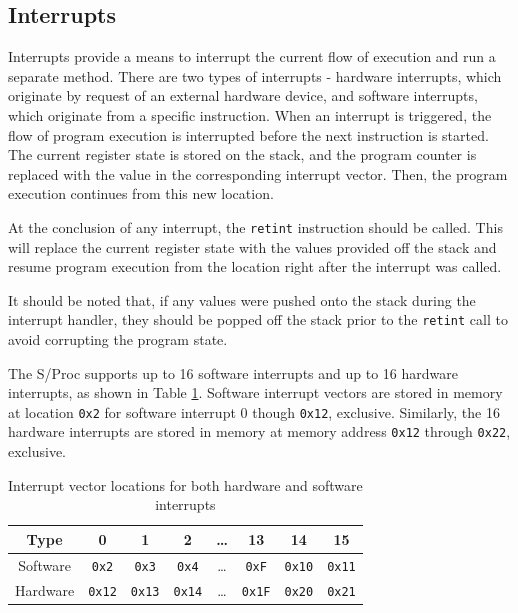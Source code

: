 \documentclass{article}
\begin{document}
\subsection{Interrupts}

Interrupts provide a means to interrupt the current flow of execution and run a separate method. There are two types of interrupts - hardware interrupts, which originate by request of an external hardware device, and software interrupts, which originate from a specific instruction. When an interrupt is triggered, the flow of program execution is interrupted before the next instruction is started. The current register state is stored on the stack, and the program counter is replaced with the value in the corresponding interrupt vector. Then, the program execution continues from this new location.

At the conclusion of any interrupt, the \texttt{retint} instruction should be called. This will replace the current register state with the values provided off the stack and resume program execution from the location right after the interrupt was called.

It should be noted that, if any values were pushed onto the stack during the interrupt handler, they should be popped off the stack prior to the \texttt{retint} call to avoid corrupting the program state.

The S/Proc supports up to 16 software interrupts and up to 16 hardware interrupts, as shown in Table \ref{table:interrupt-vector-locations}. Software interrupt vectors are stored in memory at location \texttt{0x2} for software interrupt 0 though \texttt{0x12}, exclusive. Similarly, the 16 hardware interrupts are stored in memory at memory address \texttt{0x12} through \texttt{0x22}, exclusive.

\begin{table}[h!]
	\centering
	\begin{tabular}{c|ccccccc}
		\hline
		Type & 0 & 1 & 2 & \dots & 13 & 14 & 15 \\
		\hline
		Software & \texttt{0x2} & \texttt{0x3} & \texttt{0x4} & \dots & \texttt{0xF} & \texttt{0x10} & \texttt{0x11} \\
		Hardware & \texttt{0x12} & \texttt{0x13} & \texttt{0x14} & \dots & \texttt{0x1F} & \texttt{0x20} & \texttt{0x21} \\
		\hline
	\end{tabular}
	\caption{Interrupt vector locations for both hardware and software interrupts}
	\label{table:interrupt-vector-locations}
\end{table}
\end{document}
